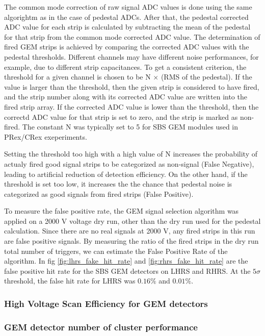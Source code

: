 The common mode correction of raw signal ADC values is done using the same algorightm as
 in the case of pedestal ADCs. After that, the pedestal corrected ADC value for each strip is
calculated by  subtracting  the mean of the pedestal for that strip from the common mode 
corrected ADC value. The determination of fired  GEM  strips is achieved  
by comparing the corrected ADC  values with the pedestal thresholds. Different channels may have different 
noise performances, for example,  due to different strip capacitances.  To get a consistent criterion,
 the threshold for a  given channel is chosen to be N $\times$ (RMS of the pedestal).  
If the value is larger than the threshold, then the  given strip is  considered to have fired,
 and the strip number along with  its corrected ADC value are written into the fired strip array.  
If the corrected ADC value is lower than the threshold, then the correctd ADC value for that strip 
is set to zero, and the strip is marked as non-fired. The constant N was typically set to 5 for 
SBS GEM modules used in PRex/CRex exeperiments. 

Setting the threshold   too high with a high value of N increases the probability of  actualy  fired 
good signal  strips to  be categorized as  non-signal  (False Negative), leading to artificial reduction 
of detection efficiency.  On the other hand, if the threshold is set too low, it increases the the 
 chance that pedestal  noise is categorized as good signals from fired strips (False Positive). 

To measure the false positive rate, the GEM signal selection algorithm was applied on a 2000 V voltage 
dry run, other than the dry run used for the pedestal calculation. Since there are no real signals  at 
2000 V,  any fired strips in this run are false positive signals. By measuring the ratio of the fired 
strips in the dry run total number of triggers, we can estimate the False Positive Rate of the algorithm. 
In fig \ref{fig:lhrs_fake_hit_rate} and \ref{fig:rhrs_fake_hit_rate} are the false positive  hit rate 
for the SBS GEM detectors on LHRS and RHRS. At the $5\sigma$ threshold, the false hit rate for LHRS 
was $0.16\%$ and $0.01\%$.

\subsubsection{High Voltage Scan Efficiency for GEM detectors}
\subsubsection{GEM detector number of cluster performance}
